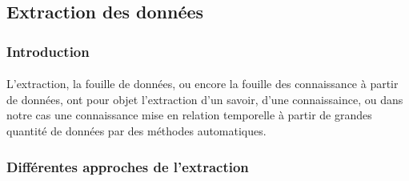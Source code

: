 \documentclass[12pt,a4	]{report}
\begin{document}
\subsection*{Extraction des données}
\subsubsection*{Introduction}
\paragraph{}
L'extraction, la fouille de données, ou encore la fouille des connaissance à partir de données, ont pour  objet l'extraction d'un savoir, d'une connaissaince, ou dans notre cas une connaissance mise en relation temporelle à partir de grandes quantité de données par des méthodes automatiques.
\subsubsection*{Différentes approches de l'extraction }
\end{document}
